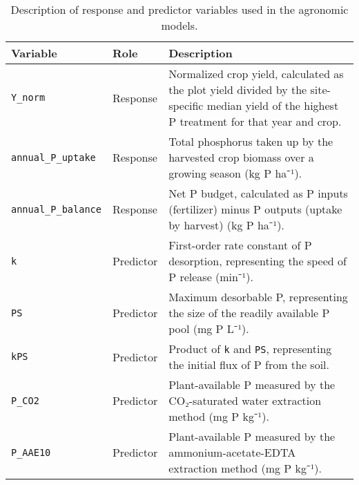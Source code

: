 \documentclass[
  letterpaper,
  DIV=11,
  numbers=noendperiod]{scrartcl}
\begin{document}
\begin{longtable}[]{@{}
  >{\raggedright\arraybackslash}p{}
  >{\raggedright\arraybackslash}p{}
  >{\raggedright\arraybackslash}p{}@{}}

\caption{\label{tbl-variables}Description of response and predictor
variables used in the agronomic models.}

\tabularnewline

\toprule\noalign{}
\begin{minipage}[b]{\linewidth}\raggedright
Variable
\end{minipage} & \begin{minipage}[b]{\linewidth}\raggedright
Role
\end{minipage} & \begin{minipage}[b]{\linewidth}\raggedright
Description
\end{minipage} \\
\midrule\noalign{}
\endhead
\bottomrule\noalign{}
\endlastfoot
\texttt{Y\_norm} & Response & Normalized crop yield, calculated as the
plot yield divided by the site-specific median yield of the highest P
treatment for that year and crop. \\
\texttt{annual\_P\_uptake} & Response & Total phosphorus taken up by the
harvested crop biomass over a growing season (kg P ha⁻¹). \\
\texttt{annual\_P\_balance} & Response & Net P budget, calculated as P
inputs (fertilizer) minus P outputs (uptake by harvest) (kg P ha⁻¹). \\
\texttt{k} & Predictor & First-order rate constant of P desorption,
representing the speed of P release (min⁻¹). \\
\texttt{PS} & Predictor & Maximum desorbable P, representing the size of
the readily available P pool (mg P L⁻¹). \\
\texttt{kPS} & Predictor & Product of \texttt{k} and \texttt{PS},
representing the initial flux of P from the soil. \\
\texttt{P\_CO2} & Predictor & Plant-available P measured by the
CO₂-saturated water extraction method (mg P kg⁻¹). \\
\texttt{P\_AAE10} & Predictor & Plant-available P measured by the
ammonium-acetate-EDTA extraction method (mg P kg⁻¹). \\

\end{longtable}
\end{document}
